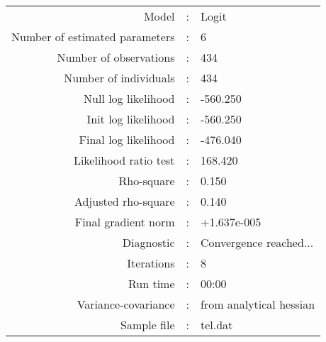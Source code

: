 

\begin{flushleft}
\begin{tabular}{rcl}
\hline
Model &:& Logit\\
Number of estimated parameters&:&6\\
Number of  observations &:& 434\\
Number of individuals&:&434\\
Null log likelihood&:&-560.250\\
Init log likelihood&:&-560.250\\
Final log likelihood&:&-476.040\\
Likelihood ratio test &:&168.420\\
Rho-square&:&0.150\\
Adjusted rho-square&:&0.140\\
Final gradient norm&:&+1.637e-005\\
Diagnostic&:&Convergence reached...\\
Iterations&:&8\\
Run time&:&00:00\\
Variance-covariance&:&from analytical hessian
\\
Sample file&:&tel.dat\\
\end{tabular}
\end{flushleft}
